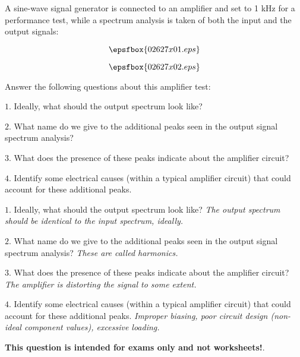 

A sine-wave signal generator is connected to an amplifier and set to 1 kHz for a performance test, while a spectrum analysis is taken of both the input and the output signals:

$$\epsfbox{02627x01.eps}$$

$$\epsfbox{02627x02.eps}$$

Answer the following questions about this amplifier test:

\medskip
\item{$1.$} Ideally, what should the output spectrum look like?
\item{$2.$} What name do we give to the additional peaks seen in the output signal spectrum analysis?
\item{$3.$} What does the presence of these peaks indicate about the amplifier circuit?
\item{$4.$} Identify some electrical causes (within a typical amplifier circuit) that could account for these additional peaks.
\medskip







\medskip
\goodbreak
\item{$1.$} Ideally, what should the output spectrum look like? {\it The output spectrum should be identical to the input spectrum, ideally.}
\item{$2.$} What name do we give to the additional peaks seen in the output signal spectrum analysis? {\it These are called harmonics.} 
\item{$3.$} What does the presence of these peaks indicate about the amplifier circuit? {\it The amplifier is distorting the signal to some extent.}
\item{$4.$} Identify some electrical causes (within a typical amplifier circuit) that could account for these additional peaks. {\it Improper biasing, poor circuit design (non-ideal component values), excessive loading.}
\medskip







{\bf This question is intended for exams only and not worksheets!}.




